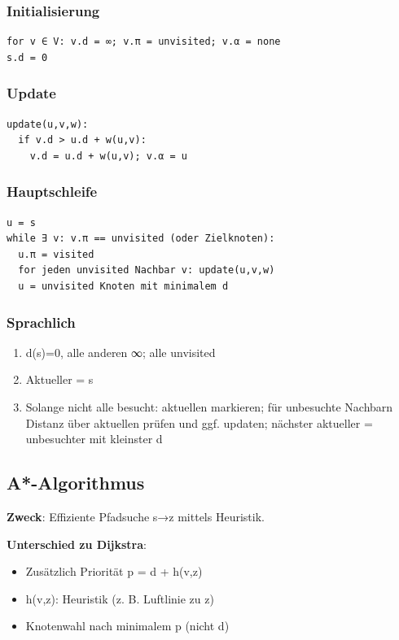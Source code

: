 \documentclass[11pt, a4paper]{article}
\begin{document}
\subsubsection{Initialisierung}
\begin{lstlisting}
for v ∈ V: v.d = ∞; v.π = unvisited; v.α = none
s.d = 0
\end{lstlisting}



\subsubsection{Update}
\begin{lstlisting}
update(u,v,w):
  if v.d > u.d + w(u,v):
    v.d = u.d + w(u,v); v.α = u
\end{lstlisting}



\subsubsection{Hauptschleife}
\begin{lstlisting}
u = s
while ∃ v: v.π == unvisited (oder Zielknoten):
  u.π = visited
  for jeden unvisited Nachbar v: update(u,v,w)
  u = unvisited Knoten mit minimalem d
\end{lstlisting}



\subsubsection{Sprachlich}
\begin{enumerate}
  \item d(s)=0, alle anderen ∞; alle unvisited
  \item Aktueller = s
  \item Solange nicht alle besucht: aktuellen markieren; für unbesuchte Nachbarn Distanz über aktuellen prüfen und ggf. updaten; nächster aktueller = unbesuchter mit kleinster d
\end{enumerate}


\subsection{A*-Algorithmus}

\textbf{Zweck}: Effiziente Pfadsuche s→z mittels Heuristik.


\textbf{Unterschied zu Dijkstra}:

\begin{itemize}
  \item Zusätzlich Priorität p = d + h(v,z)
  \item h(v,z): Heuristik (z. B. Luftlinie zu z)
  \item Knotenwahl nach minimalem p (nicht d)
\end{itemize}
\end{document}
